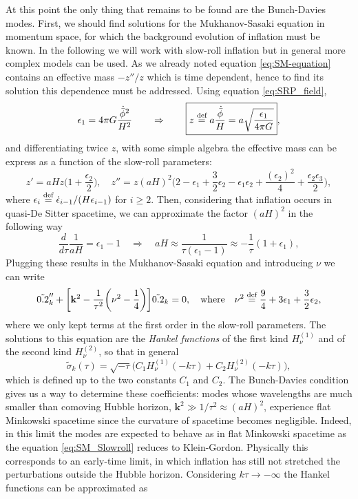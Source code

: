 At this point the only thing that remains to be found are the Bunch-Davies modes. First, we should find solutions for the Mukhanov-Sasaki equation in momentum space, for which the background evolution of inflation must be known. In the following we will work with slow-roll inflation but in general more complex models can be used. As we already noted equation \eqref{eq:SM-equation} contains an effective mass $-z''/z$ which is time dependent, hence to find its solution this dependence must be addressed. Using equation \eqref{eq:SRP_field},
$$\epsilon_1=4\pi G\frac{\dot{\bar\phi}^2}{H^2}\qquad \Rightarrow\qquad \boxed{z\stackrel{\text{def}}{=} a\frac{\dot{\bar\phi}}{H}=a\sqrt{\frac{\epsilon_1}{4\pi G}}},$$
 and differentiating twice $z$, with some simple algebra the effective mass can be express as a function of the slow-roll parameters: 
$$z'=aHz\Big(1+\frac{\epsilon_2}{2}\Big),\quad z''=z(aH)^2\bigg(2-\epsilon_1+\frac{3}{2}\epsilon_2- \epsilon_1\epsilon_2+\frac{(\epsilon_2)^2}{4}+\frac{\epsilon_2\epsilon_3}{2}\bigg),$$
where $\epsilon_i\stackrel{\text{def}}{=} \dot{\epsilon}_{i-1}/(H\epsilon_{i-1})$ for $i\geq 2$.
Then, considering that inflation occurs in quasi-De Sitter spacetime, we can approximate the factor $(aH)^2$ in the following way
$$\frac{d}{d\tau}\frac{1}{aH}=\epsilon_1-1\quad \Rightarrow\quad aH\approx\frac{1}{\tau(\epsilon_1-1)}\approx-\frac{1}{\tau}(1+\epsilon_1),$$
Plugging these results in the Mukhanov-Sasaki equation and introducing $\nu$ we can write
\begin{equation}
    \tilde{0.2}_k''+\bigg[\mathbf k^2-\frac{1}{\tau^2}\bigg(\nu^2-\frac{1}{4}\bigg)\bigg]\tilde{0.2}_k=0,\quad\text{where}\quad\nu^2\stackrel{\text{def}}{=} \frac{9}{4}+3\epsilon_1+\frac{3}{2}\epsilon_2,\label{eq:SM_Slowroll}
\end{equation}
where we only kept terms at the first order in the slow-roll parameters. The solutions to this equation are the \emph{Hankel functions} of the first kind $H_\nu^{(1)}$ and of the second kind $H_\nu^{(2)}$, so that in general
$$\tilde\sigma_k(\tau)=\sqrt{-\tau}\big(C_1H_\nu^{(1)}(-k\tau)+C_2H_\nu^{(2)}(-k\tau)\big),$$ which is defined up to the two constants $C_1$ and $C_2$. The Bunch-Davies condition gives us a way to determine these coefficients: modes whose wavelengths are much smaller than comoving Hubble horizon, $\mathbf k^2\gg1/\tau^2\approx(aH)^2$, experience flat Minkowski spacetime since the curvature of spacetime becomes negligible. Indeed, in this limit the modes are expected to behave as in flat Minkowski spacetime as the equation \eqref{eq:SM_Slowroll} reduces to Klein-Gordon. Physically this corresponds to an early-time limit, in which inflation has still not stretched the perturbations outside the Hubble horizon. Considering $k\tau\to-\infty$ the Hankel functions can be approximated as
